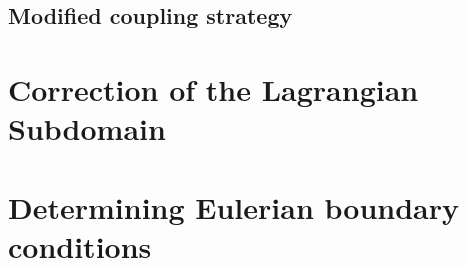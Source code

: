 	\subsection{Modified coupling strategy}

\section{Correction of the Lagrangian Subdomain}
	
	\subsection{}		
	
\section{Determining Eulerian boundary conditions}


